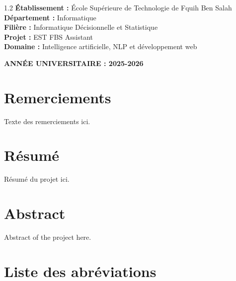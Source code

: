 \documentclass[12pt,a4paper]{report}
\begin{document}
\begin{titlepage}
\begin{flushleft}
\begin{spacing}{1.2}
            \textbf{Établissement :} École Supérieure de Technologie de Fquih Ben Salah\\
            \textbf{Département :} Informatique\\
            \textbf{Filière :} Informatique Décisionnelle et Statistique\\
            \textbf{Projet :} EST FBS Assistant\\
            \textbf{Domaine :} Intelligence artificielle, NLP et développement web
        \end{spacing}
    \end{flushleft}

    \vfill

    {\large \textbf{ANNÉE UNIVERSITAIRE : 2025-2026}}


\end{titlepage}


\chapter*{Remerciements}
Texte des remerciements ici.

\newpage

\chapter*{Résumé}
Résumé du projet ici.

\newpage

\chapter*{Abstract}
Abstract of the project here.

\newpage

\chapter*{Liste des abréviations}
\end{document}
